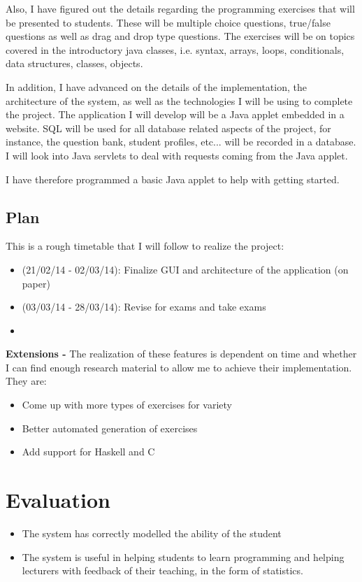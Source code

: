\documentclass[11pt,a4paper]{report}
\begin{document}
Also, I have figured out the details regarding the programming exercises that will be presented to students. These will be multiple choice questions, true/false questions as well as drag and drop type questions. The exercises will be on topics covered in the introductory java classes, i.e. syntax, arrays, loops, conditionals, data structures, classes, objects.
\newline

In addition, I have advanced on the details of the implementation, the architecture of the system, as well as the technologies I will be using to complete the project. The application I will develop will be a Java applet embedded in a website. SQL will be used for all database related aspects of the project, for instance, the question bank, student profiles, etc... will be recorded in a database. I will look into Java servlets to deal with requests coming from the Java applet. \newline

I have therefore programmed a basic Java applet to help with getting started.

\section{Plan}
This is a rough timetable that I will follow to realize the project:
\begin{itemize}
\item (21/02/14 - 02/03/14): Finalize GUI and architecture of the application (on paper)
\item (03/03/14 - 28/03/14): Revise for exams and take exams
\item 
\end{itemize}


\textbf{Extensions -} The realization of these features is dependent on time and whether I can find enough research material to allow me to achieve their implementation. They are:
\begin{itemize}
\item Come up with more types of exercises for variety
\item Better automated generation of exercises
\item Add support for Haskell and C
\end{itemize}


\chapter{Evaluation}
\begin{itemize}
\item The system has correctly modelled the ability of the student
\item The system is useful in helping students to learn programming and helping lecturers with feedback of their teaching, in the form of statistics.
\end{itemize}

\end{document}
